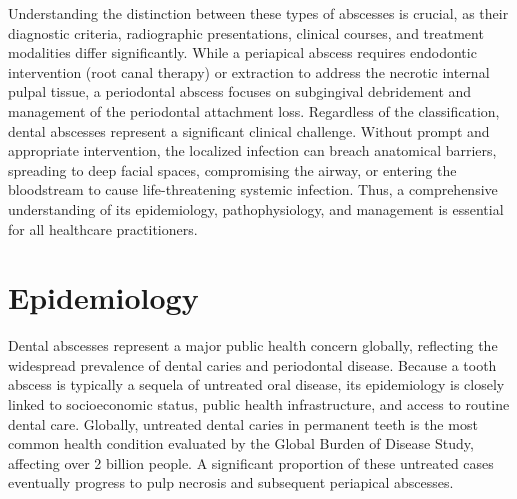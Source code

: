 Understanding the distinction between these types of abscesses is crucial, as their diagnostic criteria, radiographic presentations, clinical courses, and treatment modalities differ significantly. While a periapical abscess requires endodontic intervention (root canal therapy) or extraction to address the necrotic internal pulpal tissue, a periodontal abscess focuses on subgingival debridement and management of the periodontal attachment loss. Regardless of the classification, dental abscesses represent a significant clinical challenge. Without prompt and appropriate intervention, the localized infection can breach anatomical barriers, spreading to deep facial spaces, compromising the airway, or entering the bloodstream to cause life-threatening systemic infection. Thus, a comprehensive understanding of its epidemiology, pathophysiology, and management is essential for all healthcare practitioners.

\section*{Epidemiology}
Dental abscesses represent a major public health concern globally, reflecting the widespread prevalence of dental caries and periodontal disease. Because a tooth abscess is typically a sequela of untreated oral disease, its epidemiology is closely linked to socioeconomic status, public health infrastructure, and access to routine dental care. Globally, untreated dental caries in permanent teeth is the most common health condition evaluated by the Global Burden of Disease Study, affecting over 2 billion people. A significant proportion of these untreated cases eventually progress to pulp necrosis and subsequent periapical abscesses.

